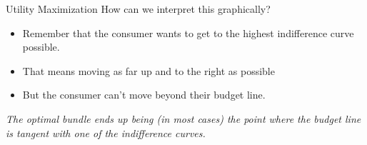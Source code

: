 \documentclass{beamer}
\begin{document}
\begin{frame}{Utility Maximization}
  How can we interpret this graphically?
  \begin{itemize}
    \item Remember that the consumer wants to get to the highest indifference curve possible.

    \item That means moving as far up and to the right as possible

    \item But the consumer can't move beyond their budget line.
  \end{itemize}
  
  \bigskip
  \emph{The optimal bundle ends up being (in most cases) the point where the budget line is tangent with one of the indifference curves.}
\end{frame}
\end{document}
